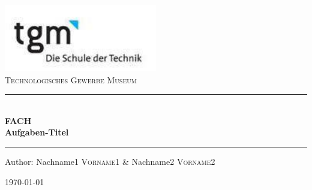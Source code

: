 \documentclass[12pt]{article}
\begin{document}
\begin{titlepage}
\begin{center}
\includegraphics[width=0.5\textwidth]{images/logo}\\[1cm]    

\textsc{\LARGE Technologisches Gewerbe Museum}\\[1.5cm]

\rule{12cm}{1mm}
{ \huge \bfseries  \\\large FACH\\ \huge Aufgaben-Titel \\[0.4cm] }

\rule{12cm}{1mm}

\noindent 
\vspace{5cm}

\begin{center}
\large
Author: 
Nachname1 \textsc{Vorname1} \&
Nachname2 \textsc{Vorname2}
\end{center}

\vfill

{\large \today}

\end{center}
\end{titlepage}

\tableofcontents


\ohead{\headmark}

\newpage
\end{document}
